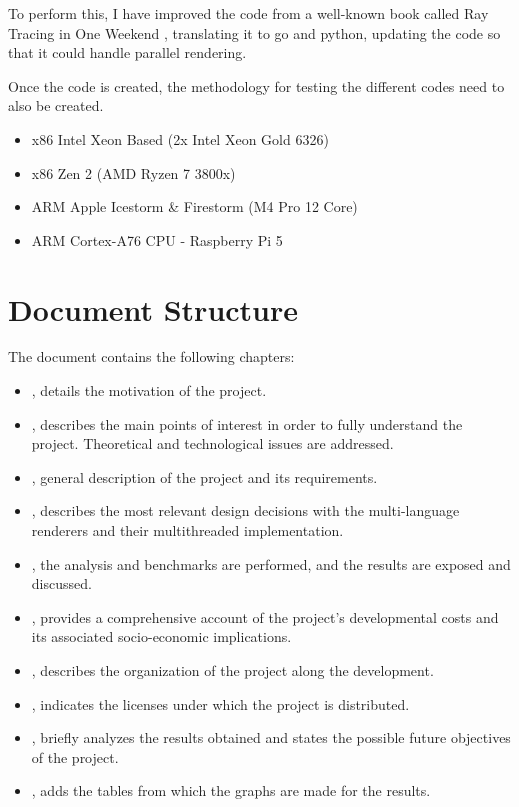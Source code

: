 To perform this, I have improved the code from a well-known book called Ray Tracing in One Weekend
\cite{Shirley2016RTW1}, translating it to go and python, updating the code so that it could handle parallel rendering. 

Once the code is created, the methodology for testing the different codes need to also be created. \begin{itemize}
    \item x86 Intel Xeon Based (2x Intel Xeon Gold 6326)
    \item x86 Zen 2 (AMD Ryzen 7 3800x)
    \item ARM Apple Icestorm \& Firestorm (M4 Pro 12 Core)
    \item ARM Cortex-A76 CPU - Raspberry Pi 5
\end{itemize} 

\section{Document Structure}\label{sec:structure}
The document contains the following chapters:
\begin{itemize}
  \item {}, details the motivation of the project.
  \item {}, describes the main points of interest in order to
fully understand the project. Theoretical and technological issues are addressed.
  \item {}, general description of the project and its requirements.
  \item {}, describes the most relevant design decisions with the multi-language renderers and their multithreaded implementation.
  \item {}, the analysis and benchmarks are performed, and the results are exposed and discussed.
  \item {}, provides a comprehensive account of the project's developmental costs and its associated socio-economic implications.
  \item {}, describes the organization of the project along the development.
  \item {}, indicates the licenses under which the project is distributed.
  \item {}, briefly analyzes the results obtained and states the possible future objectives of the project.
  \item {}, adds the tables from which the graphs are made for the results.
\end{itemize}